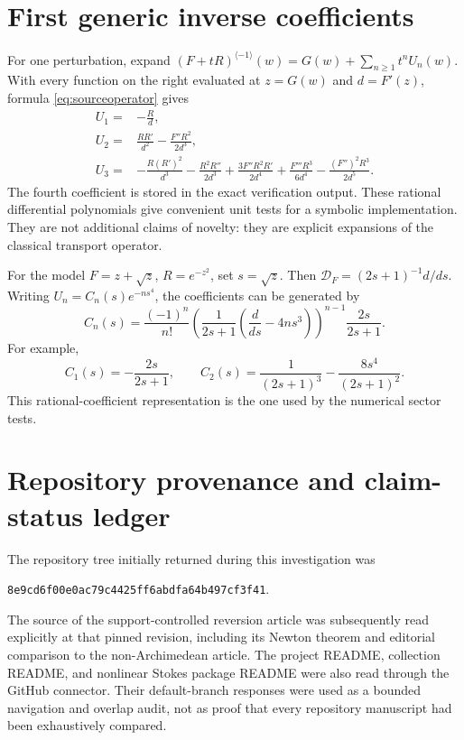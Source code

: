 \documentclass[11pt,a4paper]{article}
\theoremstyle{definition}
\theoremstyle{remark}
\newcommand{\DF}{\mathcal D_F}
\newcommand{\rev}{^{\langle-1\rangle}}
\numberwithin{equation}{section}
\begin{document}
\section{First generic inverse coefficients}\label{sec:genericcoeff}

For one perturbation, expand $(F+tR)\rev(w)=G(w)+\sum_{n\ge1}t^nU_n(w)$. With every function on the right evaluated at $z=G(w)$ and $d=F'(z)$, formula \eqref{eq:sourceoperator} gives
\begin{align}
 U_1={}&-\frac Rd,\label{eq:U1}\\
 U_2={}&\frac{RR'}{d^2}-\frac{F''R^2}{2d^3},\label{eq:U2}\\
 U_3={}&-\frac{R(R')^2}{d^3}-\frac{R^2R''}{2d^3}
 +\frac{3F''R^2R'}{2d^4}
 +\frac{F'''R^3}{6d^4}
 -\frac{(F'')^2R^3}{2d^5}.\label{eq:U3}
\end{align}
The fourth coefficient is stored in the exact verification output. These rational differential polynomials give convenient unit tests for a symbolic implementation. They are not additional claims of novelty: they are explicit expansions of the classical transport operator.

For the model $F=z+\sqrt z$, $R=e^{-z^2}$, set $s=\sqrt z$. Then $\DF=(2s+1)^{-1}d/ds$. Writing $U_n=C_n(s)e^{-ns^4}$, the coefficients can be generated by
\[
 C_n(s)=\frac{(-1)^n}{n!}
 \left(\frac{1}{2s+1}\left(\frac{d}{ds}-4ns^3\right)\right)^{n-1}
 \frac{2s}{2s+1}.
\]
For example,
\[
 C_1(s)=-\frac{2s}{2s+1},\qquad
 C_2(s)=\frac{1}{(2s+1)^3}-\frac{8s^4}{(2s+1)^2}.
\]
This rational-coefficient representation is the one used by the numerical sector tests.

\section{Repository provenance and claim-status ledger}\label{sec:provenance}

The repository tree initially returned during this investigation was
\begin{center}\small\texttt{8e9cd6f00e0ac79c4425ff6abdfa64b497cf3f41}.\end{center}
The source of the support-controlled reversion article was subsequently read explicitly at that pinned revision, including its Newton theorem and editorial comparison to the non-Archimedean article. The project README, collection README, and nonlinear Stokes package README were also read through the GitHub connector. Their default-branch responses were used as a bounded navigation and overlap audit, not as proof that every repository manuscript had been exhaustively compared.
\end{document}
